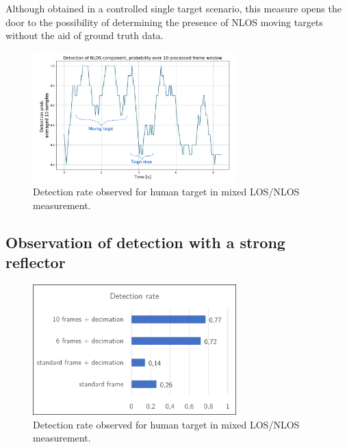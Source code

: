 Although obtained in a controlled single target scenario, this measure opens the door to the possibility of determining the presence of NLOS moving targets without the aid of ground truth data.


\begin{figure}[H]
	\centering
	\includegraphics[width=0.7\textwidth]{Images/Test1/moving_avg-transformed_wtext}
	\caption{Detection rate observed for human target in mixed LOS/NLOS measurement.}
	\label{fig:Test1_moving_avg}
\end{figure}

\subsection{Observation of detection with a strong reflector}



\begin{figure}[H]
	\centering
	\includegraphics[width=0.7\textwidth]{Images/Test1/detect_hist_strong_ref.png}
	\caption{Detection rate observed for human target in mixed LOS/NLOS measurement.}
	\label{fig:Test1_moving_avg}
\end{figure}
